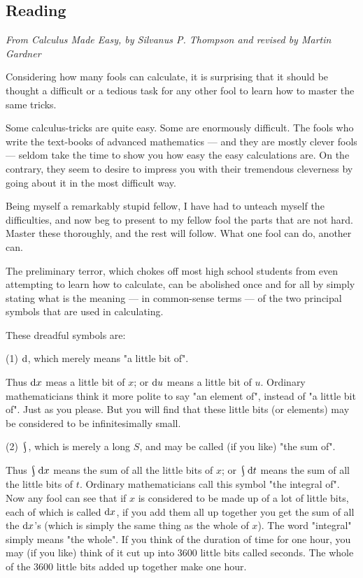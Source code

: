 



\subsection*{Reading}
\textit{From \textit{Calculus Made Easy}, by Silvanus P. Thompson and revised by Martin Gardner}

Considering how many fools can calculate, it is surprising that it should be thought a difficult or
a tedious task for any other fool to learn how to master the same tricks.

Some calculus-tricks are quite easy. Some are enormously difficult. The fools who write the text-books
of advanced mathematics --- and they are mostly clever fools --- seldom take the time to show you how
easy the easy calculations are. On the contrary, they seem to desire to impress you with their tremendous
cleverness by going about it in the most difficult way.

Being myself a remarkably stupid fellow, I have had to unteach myself the difficulties, and now beg
to present to my fellow fool the parts that are not hard. Master these thoroughly, and the rest will
follow. What one fool can do, another can.

The preliminary terror, which chokes off most high school students from even attempting to learn
how to calculate, can be abolished once and for all by simply stating what is the meaning --- in
common-sense terms --- of the two principal symbols that are used in calculating.

These dreadful symbols are:

(1) $ \dif{} $, which merely means "a little bit of".

Thus $ \dif{x} $ meas a little bit of $ x $;
or $ \dif{u} $ means a little bit of $ u $. Ordinary mathematicians think it more polite to say
"an element of", instead of "a little bit of". Just as you please. But you will find that these
little bits (or elements) may be considered to be infinitesimally small.

(2) $ \rint $, which is merely a long $ S $, and may be called (if you like) "the sum of".

Thus $ \rint \dif{x} $ means the sum of all the little bits of $ x $; or $ \rint \dif{t} $ means
the sum of all the little bits of $ t $. Ordinary mathematicians call this symbol "the integral of".
Now any fool can see that if $ x $ is considered to be made up of a lot of little bits, each of
which is called $ \dif{x} $, if you add them all up together you get the sum of all the $ \dif{x}$'s (which
is simply the same thing as the whole of $ x $). The word "integral" simply means "the whole". If you think
of the duration of time for one hour, you may  (if you like) think of it cut up into 3600 little bits
called seconds. The whole of the 3600 little bits added up together make one hour.

